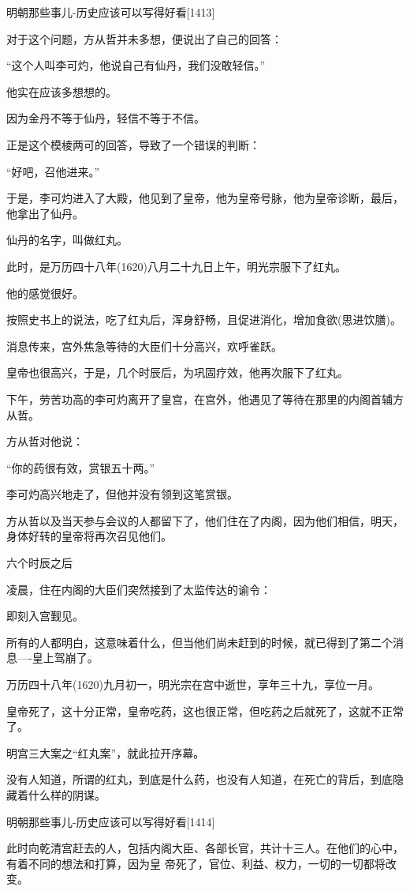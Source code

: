\documentclass[11pt,a4paper,onecolumn]{article}
\begin{document}
明朝那些事儿-历史应该可以写得好看$[$1413$]$

对于这个问题，方从哲并未多想，便说出了自己的回答：

``这个人叫李可灼，他说自己有仙丹，我们没敢轻信。''

他实在应该多想想的。

因为金丹不等于仙丹，轻信不等于不信。

正是这个模棱两可的回答，导致了一个错误的判断：

``好吧，召他进来。''

于是，李可灼进入了大殿，他见到了皇帝，他为皇帝号脉，他为皇帝诊断，最后，他拿出了仙丹。

仙丹的名字，叫做红丸。

此时，是万历四十八年(1620)八月二十九日上午，明光宗服下了红丸。

他的感觉很好。

按照史书上的说法，吃了红丸后，浑身舒畅，且促进消化，增加食欲(思进饮膳)。

消息传来，宫外焦急等待的大臣们十分高兴，欢呼雀跃。

皇帝也很高兴，于是，几个时辰后，为巩固疗效，他再次服下了红丸。

下午，劳苦功高的李可灼离开了皇宫，在宫外，他遇见了等待在那里的内阁首辅方从哲。

方从哲对他说：

``你的药很有效，赏银五十两。''

李可灼高兴地走了，但他并没有领到这笔赏银。

方从哲以及当天参与会议的人都留下了，他们住在了内阁，因为他们相信，明天，身体好转的皇帝将再次召见他们。

六个时辰之后

凌晨，住在内阁的大臣们突然接到了太监传达的谕令：

即刻入宫觐见。

所有的人都明白，这意味着什么，但当他们尚未赶到的时候，就已得到了第二个消息----皇上驾崩了。

万历四十八年(1620)九月初一，明光宗在宫中逝世，享年三十九，享位一月。

皇帝死了，这十分正常，皇帝吃药，这也很正常，但吃药之后就死了，这就不正常了。

明宫三大案之``红丸案''，就此拉开序幕。

没有人知道，所谓的红丸，到底是什么药，也没有人知道，在死亡的背后，到底隐藏着什么样的阴谋。

明朝那些事儿-历史应该可以写得好看$[$1414$]$

此时向乾清宫赶去的人，包括内阁大臣、各部长官，共计十三人。在他们的心中，有着不同的想法和打算，因为皇
帝死了，官位、利益、权力，一切的一切都将改变。
\end{document}
